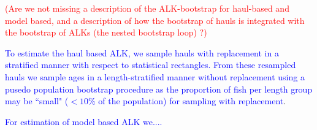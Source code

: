 \documentclass[a4paper 12pt]{article}
\numberwithin{equation}{section}
\newcommand{\ed}[1]{\textcolor{red}{#1}}
\newcommand{\nat}[1]{\textcolor{blue}{#1}}
\begin{document}
\ed{(Are we not missing a description of the ALK-bootstrap for haul-based and model based, and a description of how the bootstrap of hauls is integrated with the bootstrap of ALKs (the nested bootstrap loop) ?)} 

\nat{To estimate the haul based ALK, we sample hauls with replacement in a stratified manner with respect to statistical rectangles. From these resampled hauls we sample ages in a length-stratified manner without replacement using a pusedo population bootstrap procedure  \citep{mashreghi2016survey} as the proportion of fish per length group may be ``small" ($< 10\%$ of the population) for sampling with replacement}.


\nat{For estimation of model based ALK we....} \\

\end{document}
